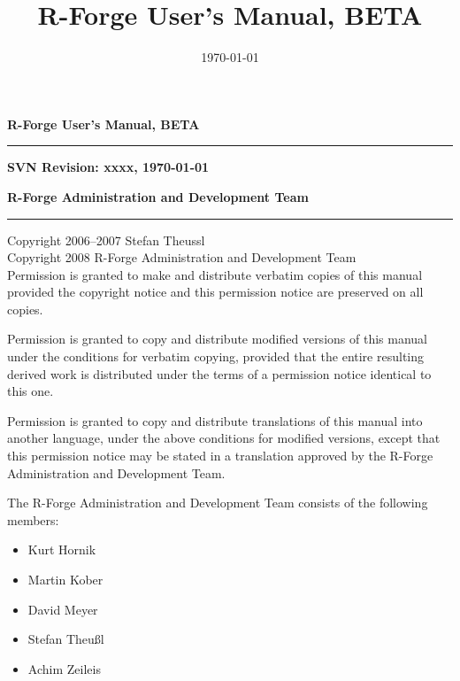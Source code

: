 \documentclass[a4paper]{report}
\title{R-Forge User's Manual, BETA}
\author{\RFORGE}
\date{\today}
\newcommand{\RFORGE}{R-Forge Administration and Development Team}
\begin{document}
\pagestyle{empty}


\begin{titlepage}

  {\LARGE \raggedleft \textbf{R-Forge User's Manual, BETA}}\\
  \rule{\linewidth}{1.5mm}
  \begin{flushright}
  \textbf{SVN Revision: xxxx, \today}\\
  \end{flushright}

  \vspace*{\fill}
   
  {\Large \raggedleft
    \textbf{\RFORGE{}}
    \rule{\linewidth}{1mm} 
  }
  
\end{titlepage}




\newpage
\vspace*{\fill}

Copyright 2006--2007 Stefan Theussl\\
Copyright 2008 \RFORGE{}\\

Permission is granted to make and distribute verbatim copies of this
manual provided the copyright notice and this permission notice are
preserved on all copies.

Permission is granted to copy and distribute modified versions of this
manual under the conditions for verbatim copying, provided that the
entire resulting derived work is distributed under the terms of a
permission notice identical to this one. 

Permission is granted to copy and distribute translations of this
manual into another language, under the above conditions for modified
versions, except that this permission notice may be stated in a
translation approved by the \RFORGE{}. 

The \RFORGE{} consists of the
following members:

\begin{itemize}
\item Kurt Hornik  
\item Martin Kober 
\item David Meyer 
\item Stefan Theu\ss{}l
\item Achim Zeileis
\end{itemize}
\end{document}
